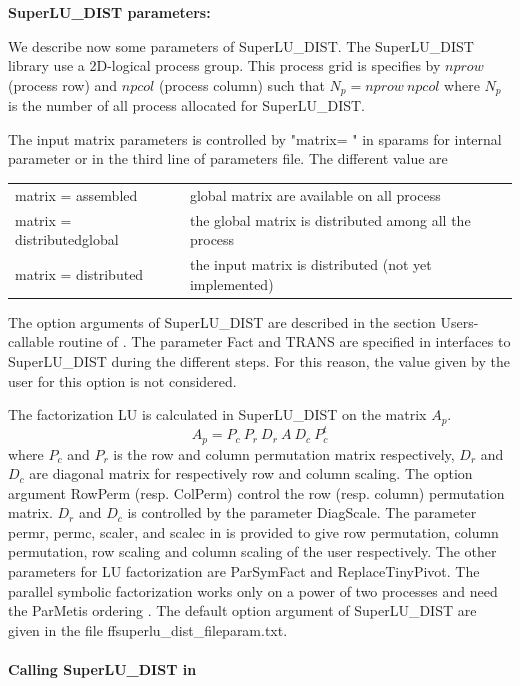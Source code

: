 \documentclass[a4paper,twoside,12pt]{book}
\begin{document}
\begin{paragraph}
{\bf{SuperLU\_DIST parameters: }}

We describe now some parameters of SuperLU\_DIST. The SuperLU\_DIST library use a 2D-logical process group. This process grid is specifies by $nprow$ (process row) and $npcol$ (process column) such that $N_{p} = nprow \: npcol$ where $N_{p}$ is the number of all process allocated for SuperLU\_DIST.

The input matrix parameters is controlled by  "matrix= " in  sparams for internal parameter or in the third line of parameters file. The different value are\\
\begin{tabular}{ll}
matrix = assembled            & global matrix are available on all process \\
matrix = distributedglobal  & the global matrix is distributed among all the process \\
 matrix = distributed            & the input matrix is distributed (not yet implemented) \\
\end{tabular}

The option arguments of SuperLU\_DIST are described in the section Users-callable routine of \cite{sluuserguide}. The parameter Fact and TRANS are specified in \freefempp interfaces to SuperLU\_DIST during the different steps. For this reason, the value given by the user for this option is not considered.

The factorization LU is calculated in SuperLU\_DIST on the matrix $A_p$.
$$
A_{p} =  P_{c} \:  P_r \: D_r \: A \: D_{c} \: P_{c}^{t}
$$
where $P_c$ and $P_r$ is the row and column permutation matrix respectively, $D_r$ and $D_c$ are diagonal matrix for respectively row and column scaling.
The option argument RowPerm (resp. ColPerm) control the row (resp. column) permutation matrix.  $D_r$ and $D_c$ is controlled by the parameter DiagScale.
The parameter permr, permc, scaler, and scalec in \freefempp is provided to give row permutation, column permutation, row scaling and column scaling of the user respectively.
The other parameters for LU factorization are ParSymFact and ReplaceTinyPivot.  The parallel symbolic factorization works only on a power of two processes and
need the ParMetis ordering \cite{parmetis}. The default option argument of SuperLU\_DIST are given in the file ffsuperlu\_dist\_fileparam.txt.
\end{paragraph}

\paragraph{Calling SuperLU\_DIST in \freefempp}
\end{document}
